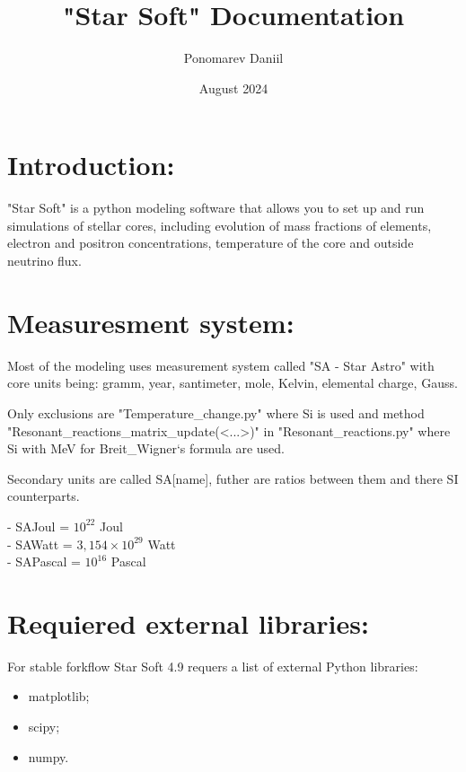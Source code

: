 \documentclass[a4paper,12pt]{article}
\title{"Star Soft" Documentation}
\author{Ponomarev Daniil}
\date{August 2024}
\begin{document}
\maketitle

\tableofcontents{}

\section{Introduction:}

"Star Soft" is a python modeling software that allows you to set up and run simulations of stellar cores, including evolution of mass fractions of elements, electron and positron concentrations, temperature of the core and outside neutrino flux.

\section{Measuresment system:}

Most of the modeling uses measurement system called "SA - Star Astro" with core units being: gramm, year, santimeter, mole, Kelvin, elemental charge, Gauss.

Only exclusions are "Temperature\_change.py" where Si is used and method "Resonant\_reactions\_matrix\_update(<...>)" in "Resonant\_reactions.py" where Si with MeV for Breit\_Wigner`s formula are used.

Secondary units are called SA[name], futher are ratios between them and there SI counterparts.

\vspace{1em}

\noindent - SAJoul = $10^{22}$ Joul \\
- SAWatt = $3,154 \times 10^{29}$ Watt \\
- SAPascal = $10^{16}$ Pascal \\

\section{Requiered external libraries:}

For stable forkflow Star Soft 4.9 requers a list of external Python libraries:

\begin{itemize}
\item matplotlib;
\item scipy;
\item numpy.
\end{itemize}
\end{document}

